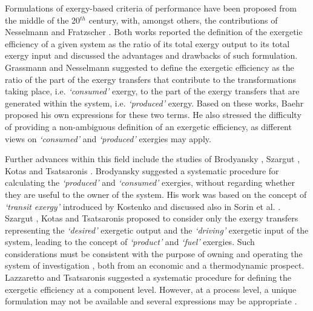 \documentclass[times,3p]{elsarticle}
\begin{document}
Formulations of exergy-based criteria of performance have been proposed from the middle of the 20$^{th}$ century, with, amongst others, the contributions of Nesselmann \cite{Nesselmann1952} and Fratzscher \cite{Fratzscher1981,Fratzscher1986}. Both works reported the definition of the exergetic efficiency of a given system as the ratio of its total exergy output to its total exergy input and discussed the advantages and drawbacks of such formulation. Grassmann \cite{Grassmann1950} and Nesselmann \cite{Nesselmann1953} suggested to define the exergetic efficiency as the ratio of the part of the exergy transfers that contribute to the transformations taking place, i.e. \emph{`consumed'} exergy, to the part of the exergy transfers that are generated within the system, i.e. \emph{`produced'} exergy. Based on these works, Baehr \cite{Baehr1965,Baehr1968} proposed his own expressions for these two terms. He also stressed the difficulty of providing a non-ambiguous definition of an exergetic efficiency, as different views on \emph{`consumed'} and \emph{`produced'} exergies may apply.

Further advances within this field include the studies of Brodyansky \cite{Brodyansky1994}, Szargut \cite{Szargut1988,Morris1994,Szargut1998}, Kotas \cite{Kotas1995} and Tsatsaronis \cite{Tsatsaronis1993,Thermoeconomics2001}. Brodyansky \cite{Brodyansky1994} suggested a systematic procedure for calculating the \emph{`produced'} and \emph{`consumed'} exergies, without regarding whether they are useful to the owner of the system. His work was based on the concept of \emph{`transit exergy'} introduced by Kostenko \cite{Kostenko1983} and discussed also in Sorin et al. \cite{Sorin1994}. Szargut \cite{Szargut1988,Morris1994,Szargut1998}, Kotas \cite{Kotas1995} and Tsatsaronis \cite{Tsatsaronis1993,Thermoeconomics2001} proposed to consider only the exergy transfers representing the \emph{`desired'} exergetic output and the \emph{`driving'} exergetic input of the system, leading to the concept of  \emph{`product'} and \emph{`fuel'} exergies. Such considerations must be consistent with the purpose of owning and operating the system of investigation \cite{Kotas1980,Kotas1980a,BejanAdrian;TsatsaronisGeorge;Moran1996,Moran1998}, both from an economic and a thermodynamic prospect. Lazzaretto and Tsatsaronis \cite{Lazzaretto1999,Lazzaretto2006} suggested a systematic procedure for defining the exergetic efficiency at a component level. However, at a process level, a unique formulation may not be available and several expressions may be appropriate \cite{Tsatsaronis1993}.
\end{document}
